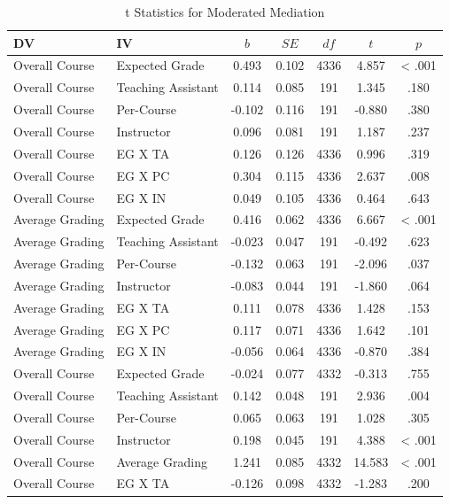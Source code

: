 \documentclass[man]{apa6}
\theoremstyle{definition}
\theoremstyle{definition}
\theoremstyle{definition}
\theoremstyle{remark}
\begin{document}
\begin{table}[tbp]
\begin{center}
\begin{threeparttable}
\caption{\label{tab:table-mod-med}t Statistics for Moderated Mediation}
\small{
\begin{tabular}{llccccc}
\toprule
DV & IV & $b$ & $SE$ & $df$ & $t$ & $p$\\
\midrule
Overall Course & Expected Grade & 0.493 & 0.102 & 4336 & 4.857 & < .001\\
Overall Course & Teaching Assistant & 0.114 & 0.085 & 191 & 1.345 & .180\\
Overall Course & Per-Course & -0.102 & 0.116 & 191 & -0.880 & .380\\
Overall Course & Instructor & 0.096 & 0.081 & 191 & 1.187 & .237\\
Overall Course & EG X TA & 0.126 & 0.126 & 4336 & 0.996 & .319\\
Overall Course & EG X PC & 0.304 & 0.115 & 4336 & 2.637 & .008\\
Overall Course & EG X IN & 0.049 & 0.105 & 4336 & 0.464 & .643\\
Average Grading & Expected Grade & 0.416 & 0.062 & 4336 & 6.667 & < .001\\
Average Grading & Teaching Assistant & -0.023 & 0.047 & 191 & -0.492 & .623\\
Average Grading & Per-Course & -0.132 & 0.063 & 191 & -2.096 & .037\\
Average Grading & Instructor & -0.083 & 0.044 & 191 & -1.860 & .064\\
Average Grading & EG X TA & 0.111 & 0.078 & 4336 & 1.428 & .153\\
Average Grading & EG X PC & 0.117 & 0.071 & 4336 & 1.642 & .101\\
Average Grading & EG X IN & -0.056 & 0.064 & 4336 & -0.870 & .384\\
Overall Course & Expected Grade & -0.024 & 0.077 & 4332 & -0.313 & .755\\
Overall Course & Teaching Assistant & 0.142 & 0.048 & 191 & 2.936 & .004\\
Overall Course & Per-Course & 0.065 & 0.063 & 191 & 1.028 & .305\\
Overall Course & Instructor & 0.198 & 0.045 & 191 & 4.388 & < .001\\
Overall Course & Average Grading & 1.241 & 0.085 & 4332 & 14.583 & < .001\\
Overall Course & EG X TA & -0.126 & 0.098 & 4332 & -1.283 & .200\\

\end{tabular}}
\end{threeparttable}
\end{center}
\end{table}
\end{document}
